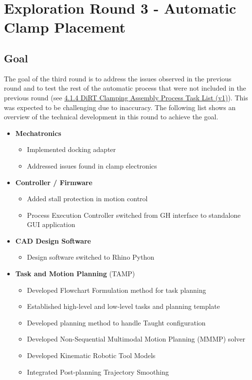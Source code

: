 \chapter{Exploration Round 3 - Automatic Clamp Placement}
\label{chapter:exploration_round_3}

\section{Goal}
\label{section:exploration_3_goal}

The goal of the third round is to address the issues observed in the previous round and to test the rest of the automatic process that were not included in the previous round (see \ul{4.1.4 DiRT Clamping Assembly Process Task List (v1)}). This was expected to be challenging due to inaccuracy. The following list shows an overview of the technical development in this round to achieve the goal. 

\begin{itemize}
	\item \textbf{Mechatronics}
    \begin{itemize}
	   \item Implemented docking adapter
	   \item Addressed issues found in clamp electronics
    \end{itemize}
    
	\item \textbf{Controller / Firmware}
    \begin{itemize}
    	\item Added stall protection in motion control
    	\item Process Execution Controller switched from GH interface to standalone GUI application
    \end{itemize}
    
	\item \textbf{CAD Design Software}
    \begin{itemize}
    	\item Design software switched to Rhino Python
    \end{itemize}
    
    \item \textbf{Task and Motion Planning }(TAMP)
    \begin{itemize}
    	\item Developed Flowchart Formulation method for task planning
    	\item Established high-level and low-level tasks and planning template
    	\item Developed planning method to handle Taught configuration
    	\item Developed Non-Sequential Multimodal Motion Planning (MMMP) solver
    	\item Developed Kinematic Robotic Tool Models
    	\item Integrated Post-planning Trajectory Smoothing
    \end{itemize}
    
\end{itemize}

